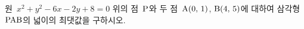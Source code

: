 원~$x^2+y^2-6x-2y+8=0$ 위의 점~$\mathrm{P}$와 두 점~$\mathrm{A}(0,\,1)$, $\mathrm{B}(4,\,5)$에 대하여 삼각형~$\mathrm{PAB}$의 넓이의 최댓값을 구하시오.
